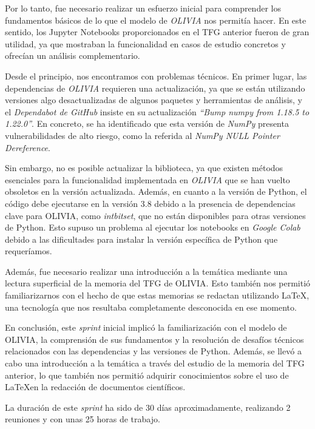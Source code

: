 Por lo tanto, fue necesario realizar un esfuerzo inicial para comprender los fundamentos básicos de lo que el modelo 
de \textit{OLIVIA} nos permitía hacer. En este sentido, los Jupyter Notebooks proporcionados en el TFG anterior fueron de 
gran utilidad, ya que mostraban la funcionalidad en casos de estudio concretos y ofrecían un análisis complementario.

Desde el principio, nos encontramos con problemas técnicos. En primer lugar, las dependencias de \textit{OLIVIA} requieren una 
actualización, ya que se están utilizando versiones algo desactualizadas de algunos paquetes y herramientas de análisis, 
y el \textit{Dependabot de GitHub} insiste en su actualización \textit{``Bump numpy from 1.18.5 to 1.22.0''}. En concreto, 
se ha identificado que esta versión de \textit{NumPy} presenta vulnerabilidades de alto riesgo, como la referida al 
\textit{NumPy NULL Pointer Dereference}.

Sin embargo, no es posible actualizar la biblioteca, ya que existen métodos esenciales para la funcionalidad 
implementada en \textit{OLIVIA} que se han vuelto obsoletos en la versión actualizada. Además, en cuanto a la versión de Python, 
el código debe ejecutarse en la versión 3.8 debido a la presencia de dependencias clave para OLIVIA, como \textit{intbitset}, 
que no están disponibles para otras versiones de Python. Esto supuso un problema al ejecutar los notebooks 
en \textit{Google Colab} debido a las dificultades para instalar la versión específica de Python que requeríamos.

Además, fue necesario realizar una introducción a la temática mediante una lectura superficial de la memoria del 
TFG de OLIVIA. Esto también nos permitió familiarizarnos con el hecho de que estas memorias se redactan 
utilizando \LaTeX, una tecnología que nos resultaba completamente desconocida en ese momento.

En conclusión, este \textit{sprint} inicial implicó la familiarización con el modelo de OLIVIA, la comprensión de 
sus fundamentos y la resolución de desafíos técnicos relacionados con las dependencias y las versiones de Python. 
Además, se llevó a cabo una introducción a la temática a través del estudio de la memoria del TFG anterior, lo que 
también nos permitió adquirir conocimientos sobre el uso de \LaTeX en la redacción de documentos científicos.

La duración de este \textit{sprint} ha sido de 30 días aproximadamente, realizando 2 reuniones y 
con unas 25 horas de trabajo.

